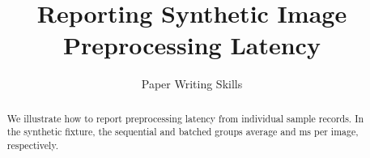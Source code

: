 \documentclass[10pt,twocolumn,letterpaper]{article}
\title{Reporting Synthetic Image Preprocessing Latency}
\author{Paper Writing Skills}
\begin{document}
\maketitle

\begin{abstract}
We illustrate how to report preprocessing latency from individual sample
records. In the synthetic fixture, the sequential and batched groups
average \SequentialMean{} and \BatchedMean{} ms per image, respectively.
\end{abstract}



{\small


}
\end{document}
